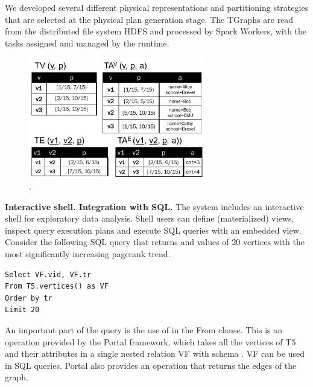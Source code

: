 We developed several different physical representations and
partitioning strategies that are selected at the physical plan
generation stage. The TGraphs are read from the distributed file
system HDFS and processed by Spark Workers, with the tasks assigned
and managed by the runtime.

\begin{figure}[t]
\centering
\includegraphics[width=3in]{figs/T1_rel.pdf}
\caption{\tg {}.}
\label{fig:tg_rel}
\end{figure}

{\bf Interactive shell. Integration with SQL.}  The \ql system
includes an interactive shell for exploratory data analysis. Shell
users can define (materialized) views, inspect query execution plans
and execute SQL queries with an embedded \ql view. Consider the
following SQL query that returns  and  values of
20 vertices with the most significantly increasing pagerank trend.

\begin{small}
\begin{verbatim}
Select VF.vid, VF.tr
From T5.vertices() as VF
Order by tr
Limit 20
\end{verbatim}
\end{small}

An important part of the query is the use of  in
the From clause. This is an operation provided by the Portal
framework, which takes all the vertices of T5 and their attributes in
a single nested relation VF with schema . VF can be used in SQL queries. Portal also
provides an operation  that returns the edges of the
graph.



